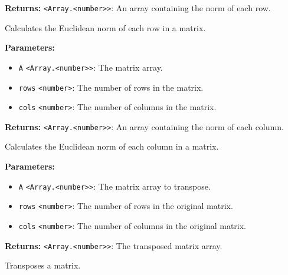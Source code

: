 \documentclass[12pt,a4paper]{article}
\begin{document}
\noindent \textbf{Returns:} \texttt{<Array.<number>>}: An array containing the norm of each row.

\noindent Calculates the Euclidean norm of each row in a matrix.

\vspace{5mm}
\noindent {}


\noindent \textbf{Parameters:}
\begin{itemize}
  \item \texttt{A} \texttt{<Array.<number>>}: The matrix array.
  \item \texttt{rows} \texttt{<number>}: The number of rows in the matrix.
  \item \texttt{cols} \texttt{<number>}: The number of columns in the matrix.
\end{itemize}

\noindent \textbf{Returns:} \texttt{<Array.<number>>}: An array containing the norm of each column.

\noindent Calculates the Euclidean norm of each column in a matrix.

\vspace{5mm}
\noindent {}


\noindent \textbf{Parameters:}
\begin{itemize}
  \item \texttt{A} \texttt{<Array.<number>>}: The matrix array to transpose.
  \item \texttt{rows} \texttt{<number>}: The number of rows in the original matrix.
  \item \texttt{cols} \texttt{<number>}: The number of columns in the original matrix.
\end{itemize}

\noindent \textbf{Returns:} \texttt{<Array.<number>>}: The transposed matrix array.

\noindent Transposes a matrix.

\vspace{5mm}
\noindent {}
\end{document}
